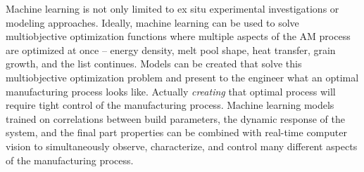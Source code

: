 Machine learning is not only limited to ex situ experimental investigations or modeling approaches. Ideally, machine learning can be used to solve multiobjective optimization functions where multiple aspects of the AM process are optimized at once -- energy density, melt pool shape, heat transfer, grain growth, and the list continues. Models can be created that solve this multiobjective optimization problem and present to the engineer what an optimal manufacturing process looks like. Actually \textit{creating} that optimal process will require tight control of the manufacturing process. Machine learning models trained on correlations between build parameters, the dynamic response of the system, and the final part properties can be combined with real-time computer vision to simultaneously observe, characterize, and control many different aspects of the manufacturing process.